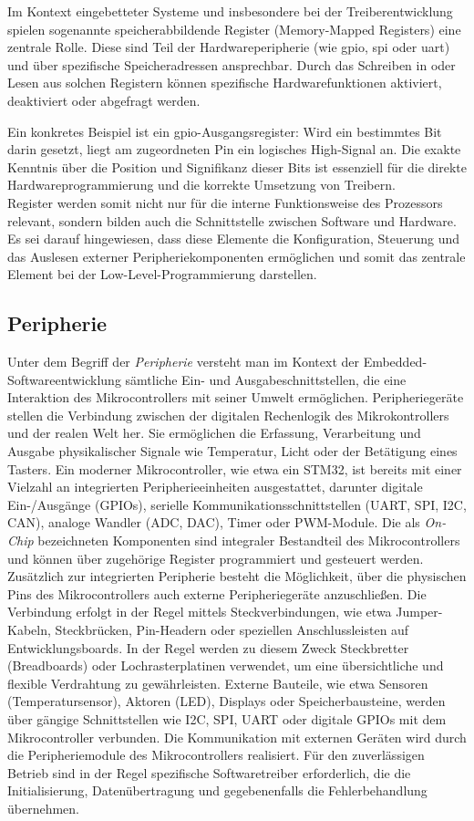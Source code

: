 Im Kontext eingebetteter Systeme und insbesondere bei der Treiberentwicklung spielen sogenannte speicherabbildende Register (Memory-Mapped Registers) eine zentrale Rolle. 
Diese sind Teil der Hardwareperipherie (wie \gls{gpio}, \gls{spi} oder \gls{uart}) und über spezifische Speicheradressen ansprechbar. 
Durch das Schreiben in oder Lesen aus solchen Registern können spezifische Hardwarefunktionen aktiviert, deaktiviert oder abgefragt werden.

Ein konkretes Beispiel ist ein \gls{gpio}-Ausgangsregister: Wird ein bestimmtes Bit darin gesetzt, liegt am zugeordneten Pin ein logisches High-Signal an. 
Die exakte Kenntnis über die Position und Signifikanz dieser Bits ist essenziell für die direkte Hardwareprogrammierung und die korrekte Umsetzung von Treibern.
\\
Register werden somit nicht nur für die interne Funktionsweise des Prozessors relevant, sondern bilden auch die Schnittstelle zwischen Software und Hardware. Es sei darauf hingewiesen, dass diese Elemente die Konfiguration, Steuerung und das Auslesen externer Peripheriekomponenten ermöglichen und somit das zentrale Element bei der Low-Level-Programmierung darstellen.

\subsection{Peripherie}
Unter dem Begriff der \emph{Peripherie} versteht man im Kontext der Embedded-Softwareentwicklung sämtliche Ein- und Ausgabeschnittstellen, die eine Interaktion des Mikrocontrollers mit seiner Umwelt ermöglichen.
Peripheriegeräte stellen die Verbindung zwischen der digitalen Rechenlogik des Mikrokontrollers und der realen Welt her.
Sie ermöglichen die Erfassung, Verarbeitung und Ausgabe physikalischer Signale wie Temperatur, Licht oder der Betätigung eines Tasters.
Ein moderner Mikrocontroller, wie etwa ein STM32, ist bereits mit einer Vielzahl an integrierten Peripherieeinheiten ausgestattet, darunter digitale Ein-/Ausgänge (GPIOs), serielle Kommunikationsschnittstellen (UART, SPI, I2C, CAN), analoge Wandler (ADC, DAC), Timer oder PWM-Module. 
Die als \emph{On-Chip} bezeichneten Komponenten sind integraler Bestandteil des Mikrocontrollers und können über zugehörige Register programmiert und gesteuert werden.
Zusätzlich zur integrierten Peripherie besteht die Möglichkeit, über die physischen Pins des Mikrocontrollers auch externe Peripheriegeräte anzuschließen. 
Die Verbindung erfolgt in der Regel mittels Steckverbindungen, wie etwa Jumper-Kabeln, Steckbrücken, Pin-Headern oder speziellen Anschlussleisten auf Entwicklungsboards. 
In der Regel werden zu diesem Zweck Steckbretter (Breadboards) oder Lochrasterplatinen verwendet, um eine übersichtliche und flexible Verdrahtung zu gewährleisten. 
Externe Bauteile, wie etwa Sensoren (Temperatursensor), Aktoren (LED), Displays oder Speicherbausteine, werden über gängige Schnittstellen wie I2C, SPI, UART oder digitale GPIOs mit dem Mikrocontroller verbunden.
Die Kommunikation mit externen Geräten wird durch die Peripheriemodule des Mikrocontrollers realisiert. 
Für den zuverlässigen Betrieb sind in der Regel spezifische Softwaretreiber erforderlich, die die Initialisierung, Datenübertragung und gegebenenfalls die Fehlerbehandlung übernehmen.

